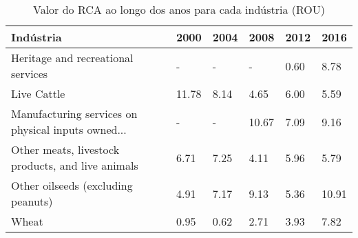 \begin{table}
\centering
\caption{Valor do RCA ao longo dos anos para cada indústria (ROU)}
\begin{tabular}{p{6cm}p{1.5cm}p{1.5cm}p{1.5cm}p{1.5cm}p{1.5cm}}
\toprule
                                         Indústria &  2000 & 2004 &  2008 & 2012 &  2016 \\
\midrule
                Heritage and recreational services &     - &    - &     - & 0.60 &  8.78 \\
                                       Live Cattle & 11.78 & 8.14 &  4.65 & 6.00 &  5.59 \\
Manufacturing services on physical inputs owned... &     - &    - & 10.67 & 7.09 &  9.16 \\
 Other meats, livestock products, and live animals &  6.71 & 7.25 &  4.11 & 5.96 &  5.79 \\
                Other oilseeds (excluding peanuts) &  4.91 & 7.17 &  9.13 & 5.36 & 10.91 \\
                                             Wheat &  0.95 & 0.62 &  2.71 & 3.93 &  7.82 \\
\bottomrule
\end{tabular}
\end{table}
